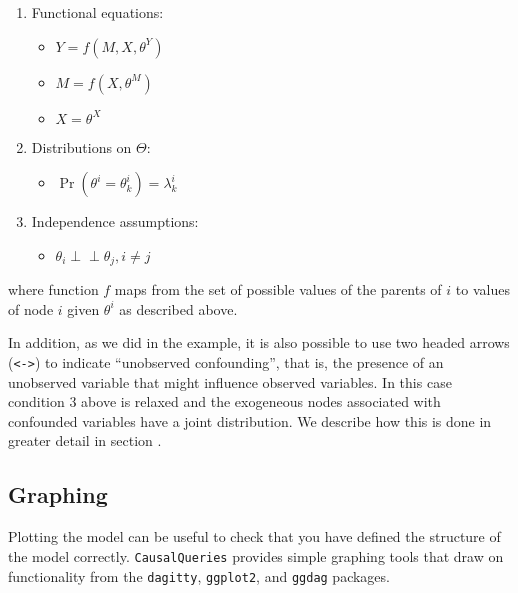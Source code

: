 \documentclass[
  11pt,
  article]{jss}
\providecommand{\tightlist}{%
  \setlength{\itemsep}{0pt}\setlength{\parskip}{0pt}}\usepackage{longtable,booktabs,array}
\begin{document}
\begin{enumerate}
\def\labelenumi{\arabic{enumi}.}
\item
  Functional equations:

  \begin{itemize}
  \tightlist
  \item
    \(Y = f(M, X, \theta^Y)\)
  \item
    \(M = f(X, \theta^M)\)
  \item
    \(X = \theta^X\)
  \end{itemize}
\item
  Distributions on \(\Theta\):

  \begin{itemize}
  \tightlist
  \item
    \(\Pr(\theta^i = \theta^i_k) = \lambda^i_k\)
  \end{itemize}
\item
  Independence assumptions:\\

  \begin{itemize}
  \tightlist
  \item
    \(\theta_i \perp\!\!\! \perp \theta_j, i\neq j\)
  \end{itemize}
\end{enumerate}

where function \(f\) maps from the set of possible values of the parents
of \(i\) to values of node \(i\) given \(\theta^i\) as described above.

In addition, as we did in the \citet{chickering1996clinician} example,
it is also possible to use two headed arrows
(\texttt{\textless{}-\textgreater{}}) to indicate ``unobserved
confounding'', that is, the presence of an unobserved variable that
might influence observed variables. In this case condition 3 above is
relaxed and the exogeneous nodes associated with confounded variables
have a joint distribution. We describe how this is done in greater
detail in section \citet{confounding}.

\hypertarget{graphing}{%
\subsection{Graphing}\label{graphing}}

Plotting the model can be useful to check that you have defined the
structure of the model correctly. \texttt{CausalQueries} provides simple
graphing tools that draw on functionality from the \texttt{dagitty},
\texttt{ggplot2}, and \texttt{ggdag} packages.
\end{document}
